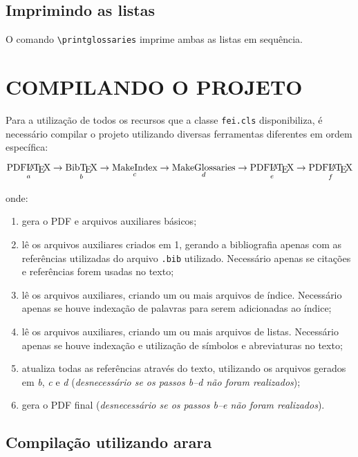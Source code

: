 \documentclass{fei}
\begin{document}
	\section{Imprimindo as listas}
	
	O comando \verb+\printglossaries+ imprime ambas as listas em sequência.

	\chapter{COMPILANDO O PROJETO} \label{chap:compilando}
	
	Para a utilização de todos os recursos que a classe \verb+fei.cls+ disponibiliza, é necessário compilar o projeto utilizando diversas ferramentas diferentes em ordem específica:
	
	\[\operatorname*{\text{PDF\LaTeX}}_a \to \operatorname*{\text{Bib\TeX}}_b \to \operatorname*{\text{MakeIndex}}_c \to \operatorname*{\text{MakeGlossaries}}_d \to \operatorname*{\text{PDF\LaTeX}}_e \to \operatorname*{\text{PDF\LaTeX}}_f\]
	
	onde:
	
	\begin{enumerate}
	\item gera o PDF e arquivos auxiliares básicos;
	\item lê os arquivos auxiliares criados em 1, gerando a bibliografia apenas com as referências utilizadas do arquivo \verb+.bib+ utilizado. Necessário apenas se citações e referências forem usadas no texto;
	\item lê os arquivos auxiliares, criando um ou mais arquivos de índice. Necessário apenas se houve indexação de palavras para serem adicionadas ao índice;
	\item lê os arquivos auxiliares, criando um ou mais arquivos de listas. Necessário apenas se houve indexação e utilização de símbolos e abreviaturas no texto;
	\item atualiza todas as referências através do texto, utilizando os arquivos gerados em \emph{b}, \emph{c} e \emph{d} (\emph{desnecessário se os passos b--d não foram realizados});
	\item gera o PDF final (\emph{desnecessário se os passos b--e não foram realizados}).
	\end{enumerate}
	
	\section{Compilação utilizando arara}
	
\end{document}
